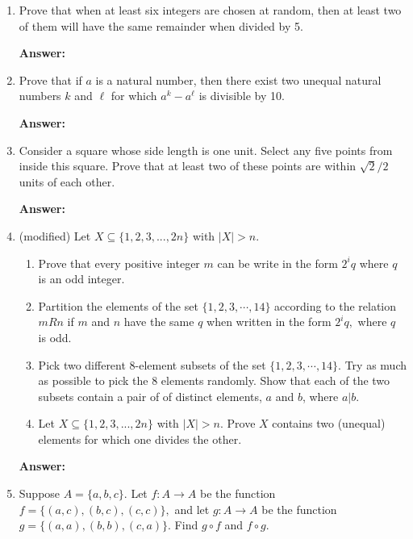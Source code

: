 \documentclass[11pt]{report}
\theoremstyle{plain}
\begin{document}
\begin{enumerate}
\textbf{Answer:} \\

\item[\textbf{12.3.1}] Prove that when at least six integers are chosen at random, then at least two of them will have the same remainder when divided by 5.

\textbf{Answer:} \\

\item[\textbf{12.3.2}] Prove that if $a$ is a natural number, then there exist two unequal natural numbers $k$ and $\ell$ for which $a^k-a^\ell$ is divisible by 10.

\textbf{Answer:} \\

\item[\textbf{12.3.4}] Consider a square whose side length is one unit. Select any five points from inside this square. Prove that at least two of these points are within $\sqrt{2}/2$ units of each other.

\textbf{Answer:} \\

\item[\textbf{12.3.7}] (modified) Let $X \subseteq \{1,2,3,...,2n\}$ with $|X| > n.$
	\begin{enumerate}
	\item[\textbf{a.}] Prove that every positive integer $m$ can be write in the form $2^iq$ where $q$ is an odd integer.
	\item[\textbf{b.}] Partition the elements of the set $\{1,2,3,\cdots, 14\}$  according to the relation $mRn$ if $m$ and $n$ have the same $q$ when written in the form $2^iq,$ where $q$ is odd.
	\item[\textbf{c.}] Pick two different 8-element subsets of the set $\{1,2,3,\cdots, 14\}.$ Try as much as possible to pick the 8 elements randomly. Show that each of the two subsets contain a pair of of distinct elements, $a$ and $b$, where $a \vert b.$
	\item[\textbf{d.}] Let $X \subseteq \{1,2,3,...,2n\}$ with $|X| > n.$ Prove $X$	
 contains two (unequal) elements for which one divides the other.
 \end{enumerate}

\textbf{Answer:} \\

\item[\textbf{12.4.4}] Suppose $A=\{a,b,c\}.$ Let $f : A \to A$ be the function $f=\{(a,c),(b,c),(c,c)\},$ and let $g : A \to A$ be the function $g=\{(a,a), (b,b),(c,a)\}.$ Find $g \circ f$ and $f \circ g.$\\


\end{enumerate}
\end{document}
